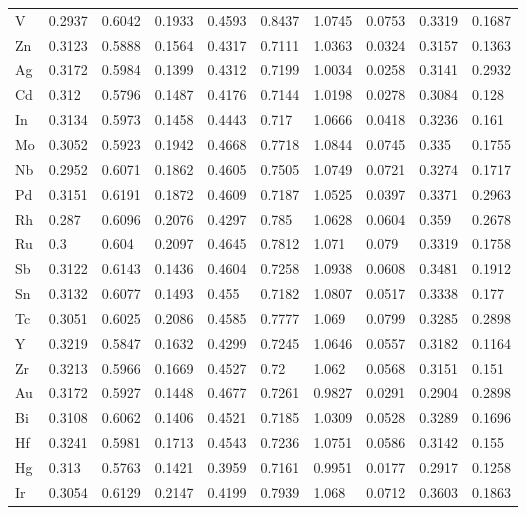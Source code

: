\begin{table}[h]
{\begin{tabular}{*{10}{l}}
      V  & 0.2937 & 0.6042 & 0.1933 & 0.4593 & 0.8437 & 1.0745 & 0.0753 & 0.3319 & 0.1687 \\
      Zn & 0.3123 & 0.5888 & 0.1564 & 0.4317 & 0.7111 & 1.0363 & 0.0324 & 0.3157 & 0.1363 \\
      Ag & 0.3172 & 0.5984 & 0.1399 & 0.4312 & 0.7199 & 1.0034 & 0.0258 & 0.3141 & 0.2932 \\
      Cd & 0.312  & 0.5796 & 0.1487 & 0.4176 & 0.7144 & 1.0198 & 0.0278 & 0.3084 & 0.128  \\
      In & 0.3134 & 0.5973 & 0.1458 & 0.4443 & 0.717  & 1.0666 & 0.0418 & 0.3236 & 0.161  \\
      Mo & 0.3052 & 0.5923 & 0.1942 & 0.4668 & 0.7718 & 1.0844 & 0.0745 & 0.335  & 0.1755 \\
      Nb & 0.2952 & 0.6071 & 0.1862 & 0.4605 & 0.7505 & 1.0749 & 0.0721 & 0.3274 & 0.1717 \\
      Pd & 0.3151 & 0.6191 & 0.1872 & 0.4609 & 0.7187 & 1.0525 & 0.0397 & 0.3371 & 0.2963 \\
      Rh & 0.287  & 0.6096 & 0.2076 & 0.4297 & 0.785  & 1.0628 & 0.0604 & 0.359  & 0.2678 \\
      Ru & 0.3    & 0.604  & 0.2097 & 0.4645 & 0.7812 & 1.071  & 0.079  & 0.3319 & 0.1758 \\
      Sb & 0.3122 & 0.6143 & 0.1436 & 0.4604 & 0.7258 & 1.0938 & 0.0608 & 0.3481 & 0.1912 \\
      Sn & 0.3132 & 0.6077 & 0.1493 & 0.455  & 0.7182 & 1.0807 & 0.0517 & 0.3338 & 0.177  \\
      Tc & 0.3051 & 0.6025 & 0.2086 & 0.4585 & 0.7777 & 1.069  & 0.0799 & 0.3285 & 0.2898 \\
      Y  & 0.3219 & 0.5847 & 0.1632 & 0.4299 & 0.7245 & 1.0646 & 0.0557 & 0.3182 & 0.1164 \\
      Zr & 0.3213 & 0.5966 & 0.1669 & 0.4527 & 0.72   & 1.062  & 0.0568 & 0.3151 & 0.151  \\
      Au & 0.3172 & 0.5927 & 0.1448 & 0.4677 & 0.7261 & 0.9827 & 0.0291 & 0.2904 & 0.2898 \\
      Bi & 0.3108 & 0.6062 & 0.1406 & 0.4521 & 0.7185 & 1.0309 & 0.0528 & 0.3289 & 0.1696 \\
      Hf & 0.3241 & 0.5981 & 0.1713 & 0.4543 & 0.7236 & 1.0751 & 0.0586 & 0.3142 & 0.155  \\
      Hg & 0.313  & 0.5763 & 0.1421 & 0.3959 & 0.7161 & 0.9951 & 0.0177 & 0.2917 & 0.1258 \\
      Ir & 0.3054 & 0.6129 & 0.2147 & 0.4199 & 0.7939 & 1.068  & 0.0712 & 0.3603 & 0.1863 \\

\end{tabular}}
\end{table}
